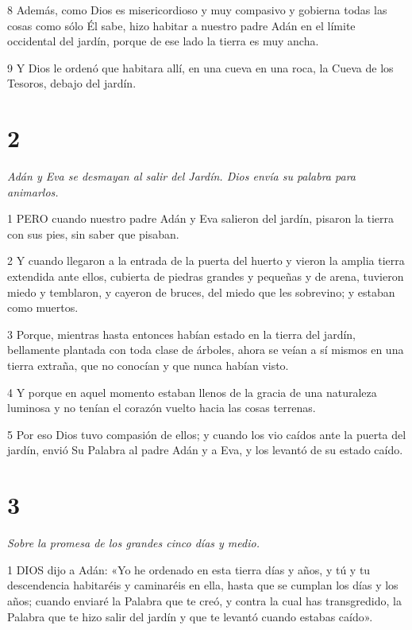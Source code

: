 \par 8 Además, como Dios es misericordioso y muy compasivo y gobierna todas las cosas como sólo Él sabe, hizo habitar a nuestro padre Adán en el límite occidental del jardín, porque de ese lado la tierra es muy ancha.

\par 9 Y Dios le ordenó que habitara allí, en una cueva en una roca, la Cueva de los Tesoros, debajo del jardín.

\chapter{2}

\par \textit{Adán y Eva se desmayan al salir del Jardín. Dios envía su palabra para animarlos.}

\par 1 PERO cuando nuestro padre Adán y Eva salieron del jardín, pisaron la tierra con sus pies, sin saber que pisaban.

\par 2 Y cuando llegaron a la entrada de la puerta del huerto y vieron la amplia tierra extendida ante ellos, cubierta de piedras grandes y pequeñas y de arena, tuvieron miedo y temblaron, y cayeron de bruces, del miedo que les sobrevino; y estaban como muertos.

\par 3 Porque, mientras hasta entonces habían estado en la tierra del jardín, bellamente plantada con toda clase de árboles, ahora se veían a sí mismos en una tierra extraña, que no conocían y que nunca habían visto.

\par 4 Y porque en aquel momento estaban llenos de la gracia de una naturaleza luminosa y no tenían el corazón vuelto hacia las cosas terrenas.

\par 5 Por eso Dios tuvo compasión de ellos; y cuando los vio caídos ante la puerta del jardín, envió Su Palabra al padre Adán y a Eva, y los levantó de su estado caído.

\chapter{3}

\par \textit{Sobre la promesa de los grandes cinco días y medio.}

\par 1 DIOS dijo a Adán: «Yo he ordenado en esta tierra días y años, y tú y tu descendencia habitaréis y caminaréis en ella, hasta que se cumplan los días y los años; cuando enviaré la Palabra que te creó, y contra la cual has transgredido, la Palabra que te hizo salir del jardín y que te levantó cuando estabas caído».

